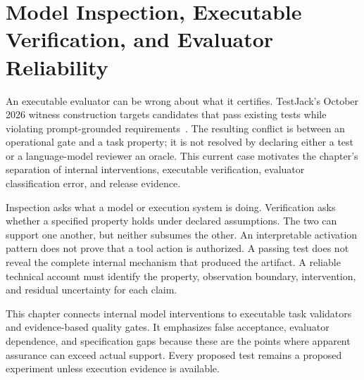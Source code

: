 \chapter{Model Inspection, Executable Verification, and Evaluator Reliability}\label{ch:C25}
An executable evaluator can be wrong about what it certifies. TestJack's October 2026 witness construction targets candidates that pass existing tests while violating prompt-grounded requirements~\cite{yao2026testjack}. The resulting conflict is between an operational gate and a task property; it is not resolved by declaring either a test or a language-model reviewer an oracle. This current case motivates the chapter's separation of internal interventions, executable verification, evaluator classification error, and release evidence.

Inspection asks what a model or execution system is doing. Verification asks whether a specified property holds under declared assumptions. The two can support one another, but neither subsumes the other. An interpretable activation pattern does not prove that a tool action is authorized. A passing test does not reveal the complete internal mechanism that produced the artifact. A reliable technical account must identify the property, observation boundary, intervention, and residual uncertainty for each claim.

This chapter connects internal model interventions to executable task validators and evidence-based quality gates. It emphasizes false acceptance, evaluator dependence, and specification gaps because these are the points where apparent assurance can exceed actual support. Every proposed test remains a proposed experiment unless execution evidence is available.









